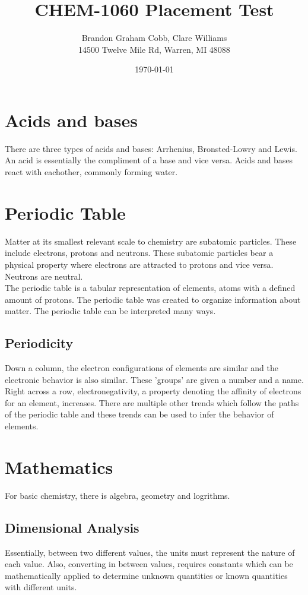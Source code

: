 \documentclass[roman, 12pt, draft]{article}
\title{CHEM-1060 Placement Test}
\author{Brandon Graham Cobb, Clare Williams \\14500 Twelve Mile Rd, Warren, MI 48088}
\date{\today}
\begin{document}
  \maketitle
  \tableofcontents
  \section{Acids and bases}
    There are three types of acids and bases: Arrhenius, Bronsted-Lowry and Lewis.
    An acid is essentially the compliment of a base and vice versa.
    Acids and bases react with eachother, commonly forming water.
  \section{Periodic Table}
    Matter at its smallest relevant scale to chemistry are subatomic particles.
    These include electrons, protons and neutrons.
    These subatomic particles bear a physical property where electrons are attracted to protons and vice versa.
    Neutrons are neutral.
    \\
    The periodic table is a tabular representation of elements, atoms with a defined amount of protons.
    The periodic table was created to organize information about matter.
    The periodic table can be interpreted many ways.
  \subsection{Periodicity}
    Down a column, the electron configurations of elements are similar and the electronic behavior is also similar.
    These 'groups' are given a number and a name.
    Right across a row, electronegativity, a property denoting the affinity of electrons for an element, increases.
    There are multiple other trends which follow the paths of the periodic table and these trends can be used to infer the behavior of elements.  
  \section{Mathematics}
    For basic chemistry, there is algebra, geometry and logrithms. 
  \subsection{Dimensional Analysis}
    Essentially, between two different values, the units must represent the nature of each value.
    Also, converting in between values, requires constants which can be mathematically applied to determine unknown quantities or known quantities with different units.
\end{document}

